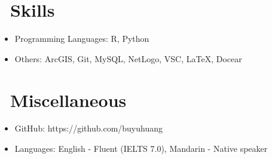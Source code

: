 \documentclass{resume}
\begin{document}
\section{\faCogs\ Skills}
\begin{itemize}[parsep=0.5ex]
	\item Programming Languages: R, Python
	\item Others: ArcGIS, Git, MySQL, NetLogo, VSC, LaTeX, Docear
\end{itemize}

\section{\faInfo\ Miscellaneous}
\begin{itemize}[parsep=0.5ex]
	\item GitHub: https://github.com/buyuhuang
	\item Languages: English - Fluent (IELTS 7.0), Mandarin - Native speaker
\end{itemize}

%
%
\end{document}
